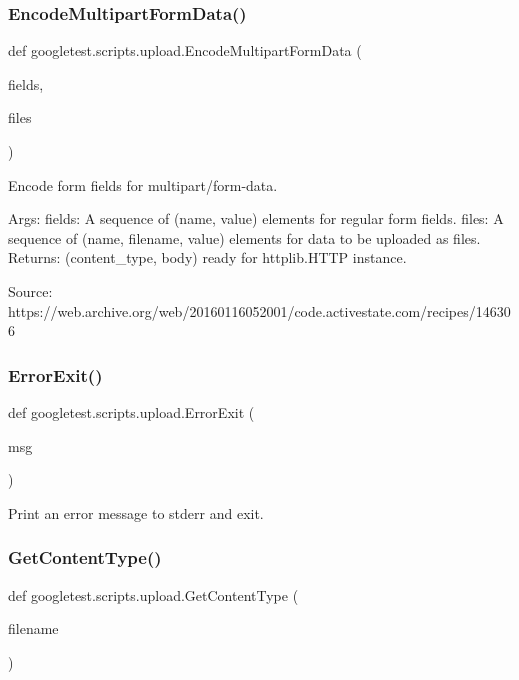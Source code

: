 \subsubsection{\texorpdfstring{EncodeMultipartFormData()}{EncodeMultipartFormData()}}
{\footnotesize\ttfamily def googletest.\+scripts.\+upload.\+Encode\+Multipart\+Form\+Data (\begin{DoxyParamCaption}\item[{}]{fields,  }\item[{}]{files }\end{DoxyParamCaption})}

\begin{DoxyVerb}Encode form fields for multipart/form-data.

Args:
  fields: A sequence of (name, value) elements for regular form fields.
  files: A sequence of (name, filename, value) elements for data to be
         uploaded as files.
Returns:
  (content_type, body) ready for httplib.HTTP instance.

Source:
  https://web.archive.org/web/20160116052001/code.activestate.com/recipes/146306
\end{DoxyVerb}
 \mbox{\label{namespacegoogletest_1_1scripts_1_1upload_afb9e613fe19c0db2466c7ad56e0f7aa2}} 
\subsubsection{\texorpdfstring{ErrorExit()}{ErrorExit()}}
{\footnotesize\ttfamily def googletest.\+scripts.\+upload.\+Error\+Exit (\begin{DoxyParamCaption}\item[{}]{msg }\end{DoxyParamCaption})}

\begin{DoxyVerb}Print an error message to stderr and exit.\end{DoxyVerb}
 \mbox{\label{namespacegoogletest_1_1scripts_1_1upload_a874a70c797078a2642e20967faa1b1da}} 
\subsubsection{\texorpdfstring{GetContentType()}{GetContentType()}}
{\footnotesize\ttfamily def googletest.\+scripts.\+upload.\+Get\+Content\+Type (\begin{DoxyParamCaption}\item[{}]{filename }\end{DoxyParamCaption})}

